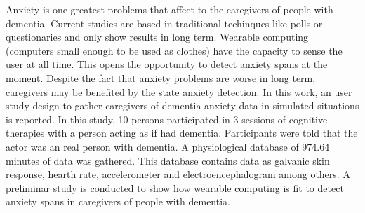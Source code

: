 Anxiety is one greatest problems that affect to the caregivers of people with dementia. Current studies are based in traditional techinques like polls or questionaries and only show results in long term. Wearable computing (computers small enough to be used as clothes) have the capacity to sense the user at all time. This opens the opportunity to detect anxiety spans at the moment. Despite the fact that anxiety problems are worse in long term, caregivers may be benefited by the state anxiety detection. In this work, an user study design to gather caregivers of dementia anxiety data in simulated situations is reported. In this study, 10 persons participated in 3 sessions of cognitive therapies with a person acting as if had dementia. Participants were told that the actor was an real person with dementia. A physiological database of 974.64 minutes of data was gathered. This database contains data as galvanic skin response, hearth rate, accelerometer and electroencephalogram among others. A preliminar study is conducted to show how wearable computing is fit to detect anxiety spans in caregivers of people with dementia.
